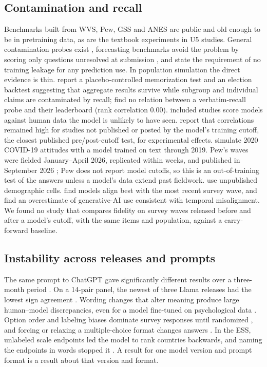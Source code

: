 \documentclass[11pt]{article}
\begin{document}
\subsection{Contamination and recall}
Benchmarks built from WVS, Pew, GSS and ANES are public and old enough to be in pretraining data, as are the textbook experiments in U5 studies. General contamination probes exist \citep{golchin2023}, forecasting benchmarks avoid the problem by scoring only questions unresolved at submission \citep{karger2024forecastbench}, and \citet{ludwig2024} state the requirement of no training leakage for any prediction use. In population simulation the direct evidence is thin. \citet{ozkan2026} report a placebo-controlled memorization test and an election backtest suggesting that aggregate results survive while subgroup and individual claims are contaminated by recall; \citet{lukauskas2026} find no relation between a verbatim-recall probe and their leaderboard (rank correlation 0.00). \cUnseen{} included studies score models against human data the model is unlikely to have seen. \citet{ashokkumar2026} report that correlations remained high for studies not published or posted by the model's training cutoff, the closest published pre/post-cutoff test, for experimental effects. \citet{kozlowski2024} simulate 2020 COVID-19 attitudes with a model trained on text through 2019. Pew's waves were fielded January--April 2026, replicated within weeks, and published in September 2026 \citep{pew2026}; Pew does not report model cutoffs, so this is an out-of-training test of the answers unless a model's data extend past fieldwork. \citet{doudkin2026} use unpublished demographic cells. \citet{liu2025global} find models align best with the most recent survey wave, and \citet{kim2026korean} find an overestimate of generative-AI use consistent with temporal misalignment. We found no study that compares fidelity on survey waves released before and after a model's cutoff, with the same items and population, against a carry-forward baseline.

\subsection{Instability across releases and prompts}
The same prompt to ChatGPT gave significantly different results over a three-month period \citep{bisbee2024}. On a 14-pair panel, the newest of three Llama releases had the lowest sign agreement \citep{lee2026openweight}. Wording changes that alter meaning produce large human--model discrepancies, even for a model fine-tuned on psychological data \citep{schroder2025}. Option order and labeling biases dominate survey responses until randomized \citep{dominguez2024}, and forcing or relaxing a multiple-choice format changes answers \citep{rottger2024}. In the ESS, unlabeled scale endpoints led the model to rank countries backwards, and naming the endpoints in words stopped it \citep{wang2026ess}. A result for one model version and prompt format is a result about that version and format.
\end{document}

